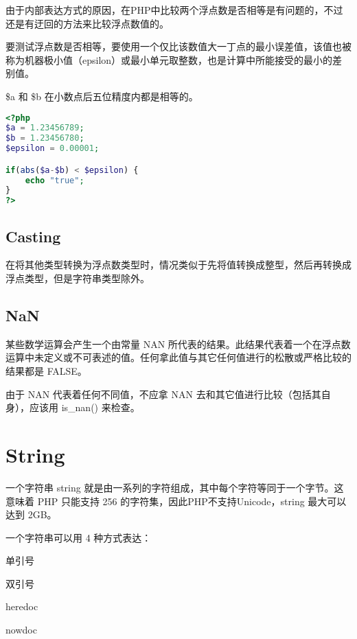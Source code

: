 由于内部表达方式的原因，在PHP中比较两个浮点数是否相等是有问题的，不过还是有迂回的方法来比较浮点数值的。

要测试浮点数是否相等，要使用一个仅比该数值大一丁点的最小误差值，该值也被称为机器极小值（epsilon）或最小单元取整数，也是计算中所能接受的最小的差别值。

\$a 和 \$b 在小数点后五位精度内都是相等的。

\begin{lstlisting}[language=PHP]
<?php
$a = 1.23456789;
$b = 1.23456780;
$epsilon = 0.00001;

if(abs($a-$b) < $epsilon) {
    echo "true";
}
?>
\end{lstlisting}

\subsection{Casting}


在将其他类型转换为浮点数类型时，情况类似于先将值转换成整型，然后再转换成浮点类型，但是字符串类型除外。

\subsection{NaN}

某些数学运算会产生一个由常量 NAN 所代表的结果。此结果代表着一个在浮点数运算中未定义或不可表述的值。任何拿此值与其它任何值进行的松散或严格比较的结果都是 FALSE。

由于 NAN 代表着任何不同值，不应拿 NAN 去和其它值进行比较（包括其自身），应该用 is\_nan() 来检查。




\section{String}

一个字符串 string 就是由一系列的字符组成，其中每个字符等同于一个字节。这意味着 PHP 只能支持 256 的字符集，因此PHP不支持Unicode，string 最大可以达到 2GB。



一个字符串可以用 4 种方式表达：

\begin{compactitem}
\item 单引号
\item 双引号
\item heredoc
\item nowdoc
\end{compactitem}


